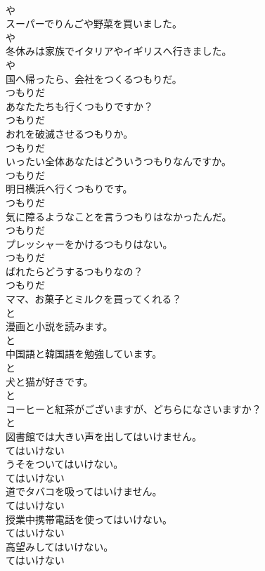\documentclass[8pt]{extreport}
\begin{document}
\begin{CJK}{UTF8}{min}
\\	や
\\	スーパーでりんごや野菜を買いました。	
\\	や
\\	冬休みは家族でイタリアやイギリスへ行きました。	
\\	や
\\	国へ帰ったら、会社をつくるつもりだ。	
\\	つもりだ
\\	あなたたちも行くつもりですか？	
\\	つもりだ
\\	おれを破滅させるつもりか。	
\\	つもりだ
\\	いったい全体あなたはどういうつもりなんですか。	
\\	つもりだ
\\	明日横浜へ行くつもりです。	
\\	つもりだ
\\	気に障るようなことを言うつもりはなかったんだ。	
\\	つもりだ
\\	プレッシャーをかけるつもりはない。	
\\	つもりだ
\\	ばれたらどうするつもりなの？	
\\	つもりだ
\\	ママ、お菓子とミルクを買ってくれる？	
\\	と
\\	漫画と小説を読みます。	
\\	と
\\	中国語と韓国語を勉強しています。	
\\	と
\\	犬と猫が好きです。	
\\	と
\\	コーヒーと紅茶がございますが、どちらになさいますか？	
\\	と
\\	図書館では大きい声を出してはいけません。	
\\	てはいけない
\\	うそをついてはいけない。	
\\	てはいけない
\\	道でタバコを吸ってはいけません。	
\\	てはいけない
\\	授業中携帯電話を使ってはいけない。	
\\	てはいけない
\\	高望みしてはいけない。	
\\	てはいけない

\end{CJK}
\end{document}
